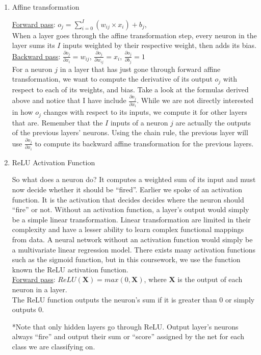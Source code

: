 \begin{enumerate}
   \item Affine transformation
  
     \underline{Forward pass}: $o_j= \sum\limits_{i=0}^{I} (w_{ij} \times x_{i}) + b_j$, \\
     When a layer goes through the affine transformation step,
     every neuron in the layer sums its $I$ inputs weighted by their respective weight, then adds its bias.\\

     \underline{Backward pass}: $\frac{\partial o_j}{\partial x_i} = w_{ij}$,
     \space\space $\frac{\partial o_j}{\partial w_{ij}} = x_i$,
     \space\space$\frac{\partial o_j}{\partial b_j} = 1$\\ 
     For a neuron $j$ in a layer that has just gone through forward affine transformation,
     we want to compute the derivative of its output $o_j$ with respect to each of its weights, and bias.
     Take a look at the formulas derived above and notice that I have include $\frac{\partial o_j}{\partial x_i}$.
     While we are not directly interested in how $o_j$ changes with respect to its inputs, we compute it for other layers that are.
     Remember that the $I$ inputs of a neuron $j$ are actually the outputs of the previous layers' neurons.
     Using the chain rule, the previous layer will use $\frac{\partial o_j}{\partial x_i}$
     to compute its backward affine transformation for the previous layers.
     

   \item ReLU Activation Function
     
     So what does a neuron do? It computes a weighted sum of its input and must now decide whether it should be ``fired''.
     Earlier we spoke of an activation function.
     It is the activation that decides decides where the neuron should ``fire'' or not.
     Without an activation function, a layer's output would simply be a simple linear transformation.
     Linear transformation are limited in their complexity and have a lesser ability to learn complex functional mappings from data.
     A neural network without an activation function would simply be a multivariate linear regression model.
     There exists many activation functions such as the sigmoid function,
     but in this coursework, we use the function known the ReLU activation function.\\
     \underline{Forward pass}: $ReLU(\textbf{X}) = max(0,\textbf{X})$, where $\textbf{X}$ is the output of each neuron in a layer.\\
     The ReLU function outputs the neuron's sum if it is greater than 0 or simply outputs 0.
     
     *Note that only hidden layers go through ReLU.
     Output layer's neurons always ``fire'' and output their sum or ``score'' assigned by the net for each class we are classifying on.
     
\end{enumerate}
